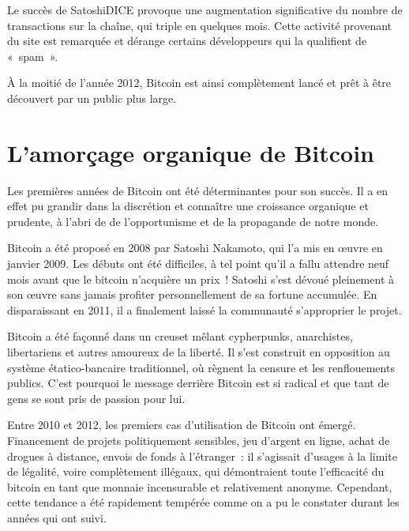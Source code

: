 Le succès de SatoshiDICE provoque une augmentation significative du nombre de transactions sur la chaîne, qui triple en quelques mois. Cette activité provenant du site est remarquée et dérange certains développeurs qui la qualifient de «~spam~».

À la moitié de l'année 2012, Bitcoin est ainsi complètement lancé et prêt à être découvert par un public plus large.

\section*{L'amorçage organique de Bitcoin}

Les premières années de Bitcoin ont été déterminantes pour son succès. Il a en effet pu grandir dans la discrétion et connaître une croissance organique et prudente, à l'abri de de l'opportunisme et de la propagande de notre monde.

Bitcoin a été proposé en 2008 par Satoshi Nakamoto, qui l'a mis en œuvre en janvier 2009. Les débuts ont été difficiles, à tel point qu'il a fallu attendre neuf mois avant que le bitcoin n'acquière un prix~! Satoshi s'est dévoué pleinement à son œuvre sans jamais profiter personnellement de sa fortune accumulée. En disparaissant en 2011, il a finalement laissé la communauté s'approprier le projet.

Bitcoin a été façonné dans un creuset mêlant cypherpunks, anarchistes, libertariens et autres amoureux de la liberté. Il s'est construit en opposition au système étatico-bancaire traditionnel, où règnent la censure et les renflouements publics. C'est pourquoi le message derrière Bitcoin est si radical et que tant de gens se sont pris de passion pour lui.

Entre 2010 et 2012, les premiers cas d'utilisation de Bitcoin ont émergé. Financement de projets politiquement sensibles, jeu d'argent en ligne, achat de drogues à distance, envois de fonds à l'étranger~: il s'agissait d'usages à la limite de légalité, voire complètement illégaux, qui démontraient toute l'efficacité du bitcoin en tant que monnaie incensurable et relativement anonyme. Cependant, cette tendance a été rapidement tempérée comme on a pu le constater durant les années qui ont suivi.